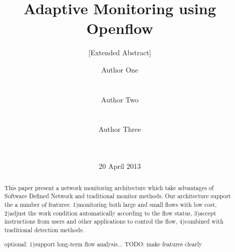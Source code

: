 \documentclass{acm_proc_article-sp}
\begin{document}
\title{Adaptive Monitoring using Openflow}
\subtitle{[Extended Abstract]}

\author{
\alignauthor
Author One\\
       \\
       \\
\alignauthor
Author Two\\
       \\
       \\
\alignauthor
Author Three\\
       \\
       \\
}


\date{20 April 2013}

\maketitle

\balance

\begin{abstract}
This paper present a network monitoring architecture which take advantages of Software Defined Network and traditional monitor methods. Our architecture support the a number of features: 1)monitoring both large and small flows with low cost, 2)adjust the work condition automatically according to the flow status, 3)accept instructions from users and other applications to control the flow, 4)combined with traditional detection methods.

optional: 1)support long-term flow analysis...
TODO: make features clearly
\end{abstract}


\end{document}
